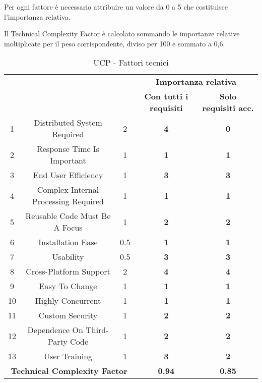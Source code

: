 Per ogni fattore è necessario attribuire un valore da 0 a 5 che costituisce l'importanza relativa.

Il Technical Complexity Factor è calcolato sommando le importanze relative moltiplicate per il peso corrispondente, diviso per 100 e sommato a 0,6.

\begin{table}[H]
\begin{adjustwidth}{-4cm}{-4cm}
	\begin{center}
		\begin{tabular}{|c|c|c|c|c|}
			\hline
			\multicolumn{ 2}{|c|}{\raisebox{-1\height}{\textbf{Fattori tecnici}}} & \multicolumn{ 1}{c|}{\raisebox{-1\height}{\textbf{Peso}}} & \multicolumn{ 2}{c|}{\textbf{Importanza relativa}} \\ \cline{ 4- 5}
			\multicolumn{ 2}{|c|}{} & \multicolumn{ 1}{c|}{} & \textbf{Con tutti i requisiti} & \textbf{Solo requisiti acc.} \\ \hline
			1 & Distributed System Required & 2 & \textbf{4} & \textbf{0} \\ \hline
			2 & Response Time Is Important & 1 & \textbf{1} & \textbf{1} \\ \hline
			3 & End User Efficiency & 1 & \textbf{3} & \textbf{3} \\ \hline
			4 & Complex Internal Processing Required & 1 & \textbf{1} & \textbf{1} \\ \hline
			5 & Reusable Code Must Be A Focus & 1 & \textbf{2} & \textbf{2} \\ \hline
			6 & Installation Ease & 0.5 & \textbf{1} & \textbf{1} \\ \hline
			7 & Usability & 0.5 & \textbf{3} & \textbf{3} \\ \hline
			8 & Cross-Platform Support & 2 & \textbf{4} & \textbf{4} \\ \hline
			9 & Easy To Change & 1 & \textbf{1} & \textbf{1} \\ \hline
			10 & Highly Concurrent & 1 & \textbf{1} & \textbf{1} \\ \hline
			11 & Custom Security & 1 & \textbf{2} & \textbf{2} \\ \hline
			12 & Dependence On Third-Party Code & 1 & \textbf{2} & \textbf{2} \\ \hline
			13 & User Training & 1 & \textbf{3} & \textbf{2} \\ \hline
			\multicolumn{ 3}{|c|}{\textbf{Technical Complexity Factor}} & \textbf{0.94} & \textbf{0.85} \\ \hline
		\end{tabular}
	\end{center}
\caption{UCP - Fattori tecnici}
\end{adjustwidth}
\end{table}

